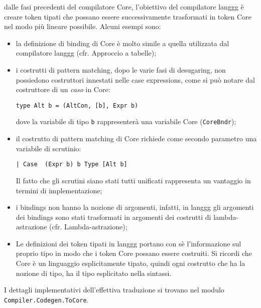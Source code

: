 \documentclass[10pt,a4paper]{article}
\begin{document}
dalle fasi precedenti del compilatore Core, l'obiettivo del compilatore langgg è creare token tipati che possano essere
successivamente trasformati in token Core nel modo più lineare possibile. Alcuni esempi sono:
\begin{itemize}
    \item la definizione di binding di Core è molto simile a quella utilizzata dal compilatore langgg (cfr.
    Approccio a tabelle);
    \item i costrutti di pattern matching, dopo le varie fasi di desugaring, non possiedono costruttori innestati nelle
    case expressions, come si può notare dal costruttore di un \textit{caso} in Core:
    \begin{lstlisting}
type Alt b = (AltCon, [b], Expr b)
    \end{lstlisting}
    dove la variabile di tipo \texttt{b} rappresenterà una variabile Core (\texttt{CoreBndr});
    \item il costrutto di pattern matching di Core richiede come secondo parametro una variabile di scrutinio:
    \begin{lstlisting}
| Case  (Expr b) b Type [Alt b]
    \end{lstlisting}
    Il fatto che gli scrutini siano stati tutti unificati rappresenta un vantaggio in termini di implementazione;
    \item i bindings non hanno la nozione di argomenti, infatti, in langgg gli argomenti dei bindings sono stati
    trasformati in argomenti dei costrutti di lambda-astrazione (cfr. Lambda-astrazione);
    \item Le definizioni dei token tipati in langgg portano con sè l'informazione sul proprio tipo in modo che i token
    Core possano essere costruiti. Si ricordi che Core è un linguaggio esplicitamente tipato, quindi ogni costrutto che
    ha la nozione di tipo, ha il tipo esplicitato nella sintassi.
\end{itemize}
I dettagli implementativi dell'effettiva traduzione si trovano nel modulo \texttt{Compiler.Codegen.ToCore}.
\end{document}
